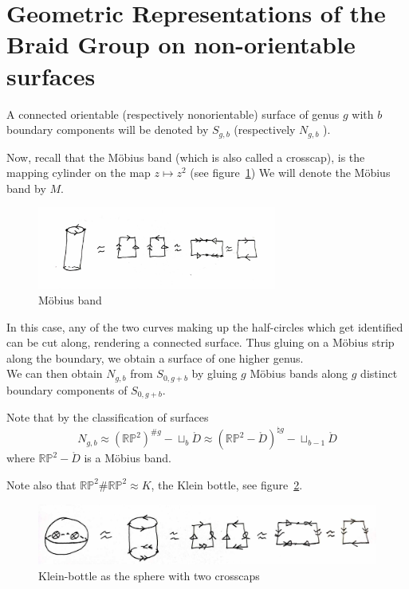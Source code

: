 \documentclass[reqno]{amsart}
\theoremstyle{definition}
\theoremstyle{remark}
\begin{document}
\newpage

\section{Geometric Representations of the Braid Group on
non-orientable surfaces}


A connected orientable (respectively nonorientable) surface
of genus $g$ with $b$ boundary components will
be denoted by $S_{g,b}$ (respectively $N_{g,b}$ ).

Now, recall that the Möbius band (which is also called
a crosscap), is the mapping cylinder on the map
$z \mapsto z^2$ (see figure~\ref{fig:mapping-cylinder-mobius})
We will denote the Möbius band by $M$.


\begin{figure}[htpb]
    \centering
    \includegraphics[width=0.7\textwidth]{mapping-cylinder-mobius.jpg}
    \caption{Möbius band}
    \label{fig:mapping-cylinder-mobius}
\end{figure}

In this case, any of the two curves making up the half-circles which
get identified can be cut along, rendering a connected surface.
Thus gluing on a Möbius strip along the boundary, we obtain a
surface of one higher genus.\\


We can then obtain $N_{g,b}$ from $S_{0,g+b}$ by
gluing $g$ Möbius bands along $g$ distinct boundary
components of $S_{0,g+b}$.

Note that by the classification of surfaces
\[
N_{g,b} \approx \left( \mathbb{R}\mathbb{P}^2 \right)^{\# g} -
\sqcup_{b} \mathring{D} \approx 
 \left(\mathbb{R}\mathbb{P}^2 - \mathring{D} 
\right)^{\natural g} - \sqcup_{b-1} \mathring{D}
\] 
where $\mathbb{R}\mathbb{P}^2 - \mathring{D}$ is a Möbius band.

Note also that $\mathbb{R}\mathbb{P}^2 \# \mathbb{R}\mathbb{P}^2
\approx K$, the Klein bottle,
see figure~\ref{fig:klein-bottle}.


\begin{figure}[H]
    \centering
    \includegraphics[width=1.2\textwidth]{klein-bottle.jpg}
    \caption{Klein-bottle as the sphere with two crosscaps}
    \label{fig:klein-bottle}
\end{figure}
\end{document}

